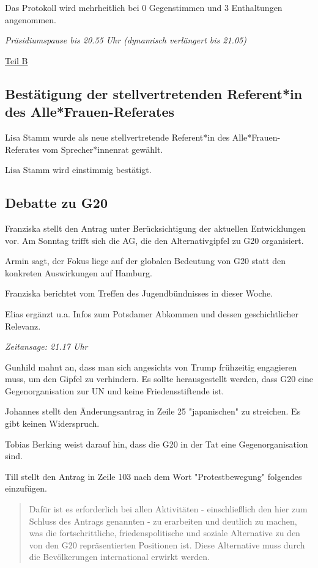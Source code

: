 \documentclass[ngerman,headheight=70pt]{scrartcl}
\begin{document}
    Das Protokoll wird mehrheitlich bei 0 Gegenstimmen und 3 Enthaltungen
    angenommen.

    \textit{Präsidiumspause bis 20.55 Uhr (dynamisch verlängert bis 21.05)}

    \vspace{0.5cm}
    {\Large \underline{Teil B}}

    \subsection{Bestätigung der stellvertretenden Referent*in des Alle*Frauen-Referates}

    Lisa Stamm wurde als neue stellvertretende Referent*in des Alle*Frauen-Referates
    vom Sprecher*innenrat gewählt.

    Lisa Stamm wird einstimmig bestätigt.

    \subsection{Debatte zu G20}

    Franziska stellt den Antrag unter Berücksichtigung der aktuellen Entwicklungen
    vor. Am Sonntag trifft sich die AG, die den Alternativgipfel zu G20 organisiert.

    Armin sagt, der Fokus liege auf der globalen Bedeutung von G20 statt den konkreten
    Auswirkungen auf Hamburg.

    Franziska berichtet vom Treffen des Jugendbündnisses in dieser Woche.

    Elias ergänzt u.a. Infos zum Potsdamer Abkommen und dessen geschichtlicher
    Relevanz.

    \textit{Zeitansage: 21.17 Uhr}

    Gunhild mahnt an, dass man sich angesichts von Trump frühzeitig engagieren
    muss, um den Gipfel zu verhindern. Es sollte herausgestellt werden, dass
    G20 eine Gegenorganisation zur UN und keine Friedensstiftende ist.

    Johannes stellt den Änderungsantrag in Zeile 25 "japanischen" zu streichen.
    Es gibt keinen Widerspruch.

    Tobias Berking weist darauf hin, dass die G20 in der Tat eine Gegenorganisation
    sind.

    Till stellt den Antrag in Zeile 103 nach dem Wort "Protestbewegung" folgendes
    einzufügen.

    \blockquote{
        Dafür ist es erforderlich bei allen Aktivitäten - einschließlich den hier
        zum Schluss des Antrags genannten - zu erarbeiten und deutlich zu machen,
        was die fortschrittliche, friedenspolitische und soziale Alternative zu
        den von den G20 repräsentierten Positionen ist. Diese Alternative muss
        durch die Bevölkerungen international erwirkt werden.
    }
\end{document}
